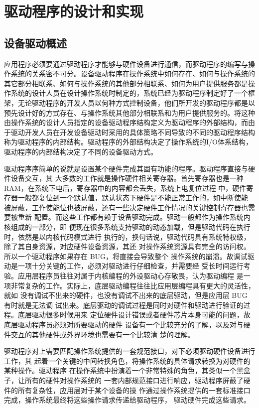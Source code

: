 \chapter{驱动程序的设计和实现}

\section{设备驱动概述}

	应用程序必须要通过驱动程序才能够与硬件设备进行通信，而驱动程序的编写与操作系统的关系密不可分。设备驱动程序在操作系统中如何存在、如何与操作系统的其它部分相联系、如何与操作系统的其他部分相联系、如何为用户提供服务都是操作系统的设计人员在设计操作系统时制定的，系统已经为驱动程序制定好了一个框架，无论驱动程序的开发人员以何种方式控制设备，他们所开发的驱动程序都是以预先设计好的方式存在、与操作系统其他部分相联系和为用户提供服务的。将这种由操作系统的设计人员指定的设备驱动程序结构定义为驱动程序的外部结构，而由于驱动开发人员在开发设备驱动时采用的具体策略不同导致的不同的驱动程序结构称为驱动程序的内部结构。驱动程序的外部结构决定了操作系统的I/O体系结构，驱动程序的内部结构决定了不同的设备驱动方式。
	
	驱动程序序简单的说就是设置某个硬件完成其固有功能的程序。驱动程序直接与硬件设备交互，其
大多数的工作就是操作硬件相关寄存器。首先寄存器也是一种 RAM，在系统下电后，寄存器中的内容都会丢失，系统上电复位过程
中，硬件寄存器一般都复位到一个默认值，默认状态下硬件是不能正常工作的，如中断使能
被屏蔽，工作使能位也被屏蔽，还有一些决定硬件工作情况的关键控制寄存器也需要被重新
配置。而这些工作都有赖于设备驱动完成。驱动一般都作为操作系统内核组成的一部分，即
便现在很多系统支持驱动的动态加载，但是驱动代码在执行时，依然是以内核代码模式进行
执行的，换句话说，驱动代码具有系统特权级，除了其自身资源，对应硬件设备资源，其还
对操作系统资源具有完全的访问权。所以一个驱动程序如果存在 BUG，将直接会导致整个
操作系统的崩溃。故调试驱动是一项十分关键的工作，必须对驱动进行仔细检查，并需要经
受长时间运行考验。应用层程序员往往对属于内核编程的外设驱动心存敬畏，认为驱动编程
是一项非常复杂的工作。实际上，底层驱动编程往往比应用层编程具有更大的灵活性，就如
没有调试不出来的硬件，也没有调试不出来的底层驱动，但是应用层 BUG 有时就是无法调
试出来。底层驱动的调试过程是同时对硬件和驱动进行验证的过程。底层驱动很多时候用来
定位硬件设计错误或者硬件芯片本身可能的问题，故底层驱动程序员必须对所要驱动的硬件
设备有一个比较充分的了解，以及对与硬件交互的其他硬件或外界环境也需要有一个比较清
楚的理解。
	
	驱动程序对上需要匹配操作系统提供的一套规范接口，对下必须驱动硬件设备进行工作，其
起着一个关键的中间转换角色，将操作系统的具体请求转换为对硬件的某种操作。驱动程序
在操作系统中扮演着一个非常特殊的角色，其类似一个黑盒子，让所有的硬件对操作系统的
一套内部规范接口进行响应，驱动程序屏蔽了硬件的所有复杂性，应用层对于某个设备的操
作通过操作系统提供的一套标准接口完成，操作系统最终将这些操作请求传递给驱动程序，
驱动硬件完成这些请求。	
	
